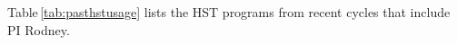 

Table\,\ref{tab:pasthstusage} lists the HST programs from recent cycles that include PI Rodney.




